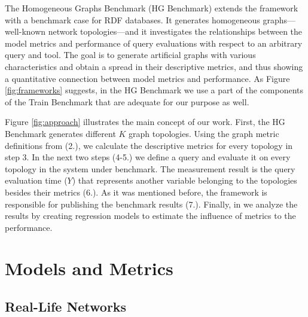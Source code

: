 The Homogeneous Graphs Benchmark (HG Benchmark) extends the \map framework with a benchmark case for RDF databases. It generates homogeneous graphs---well-known network topologies---and it investigates the relationships between the model metrics and performance of query evaluations with respect to an arbitrary query and tool. The goal is to generate artificial graphs with various characteristics and obtain a spread in their descriptive metrics, and thus showing a quantitative connection between model metrics and performance. As Figure \ref{fig:frameworks} suggests, in the HG Benchmark we use a part of the components of the Train Benchmark that are adequate for our purpose as well.

Figure \ref{fig:approach} illustrates the main concept of our work. First, the HG Benchmark generates different $K$ graph topologies. Using the graph metric definitions from \map (2.), we calculate the descriptive metrics for every topology in step 3. In the next two steps (4-5.) we define a query and evaluate it on every topology in the system under benchmark. The measurement result is the query evaluation time ($Y$) that represents another variable belonging to the topologies besides their metrics (6.). As it was mentioned before, the \sam framework is responsible for publishing the benchmark results (7.). Finally, in \map we analyze the results by creating regression models to estimate the influence of metrics to the performance.



\section{Models and Metrics}
\subsection{Real-Life Networks}

